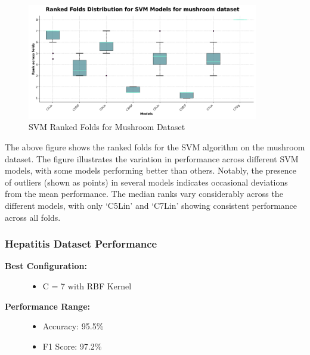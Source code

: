 \begin{figure}
    \centering
    \includegraphics[width=0.9\textwidth]{figures/ranked_folds_SVM_mushroom.png}
    \caption{SVM Ranked Folds for Mushroom Dataset}
    \label{fig:ranked_folds_SVM_mushroom}
\end{figure}

The above figure shows the ranked folds for the SVM algorithm on the mushroom dataset.
The figure illustrates the variation in performance across different SVM models, with some models performing 
better than others. Notably, the presence of outliers (shown as points) in several models indicates
occasional deviations from the mean performance. The median ranks vary considerably across the different models,
with only `C5Lin' and `C7Lin' showing consistent performance across all folds.

\subsubsection{Hepatitis Dataset Performance}



\begin{description}
    \item[\textbf{Best Configuration:}]\leavevmode
        \begin{itemize}
            \item C = 7 with RBF Kernel
        \end{itemize}
    
    \item[\textbf{Performance Range:}]\leavevmode
        \begin{itemize}
            \item Accuracy: 95.5\%
            \item F1 Score: 97.2\%
        \end{itemize}
\end{description}


